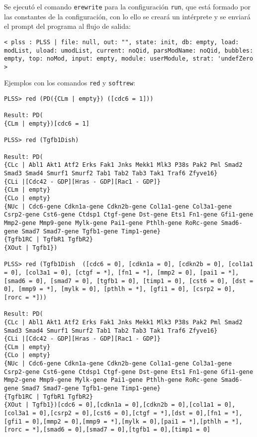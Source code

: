 Se ejecutó el comando \texttt{erewrite} para la configuración \texttt{run}, que está formado por las constantes de la configuración, con lo ello se creará un intérprete y se enviará el prompt del programa al flujo de salida:
\begin{lstlisting}[language=Maude]
< plss : PLSS | file: null, out: "", state: init, db: empty, load: modList, uload: umodList, current: noQid, parsModName: noQid, bubbles: empty, top: noMod, input: empty, module: userModule, strat: 'undefZero >
\end{lstlisting}
\smallskip


Ejemplos con los comandos \texttt{red} y \texttt{softrew}:
\begin{lstlisting}[language=Maude]
PLSS> red (PD({CLm | empty}) ([cdc6 = 1]))

Result: PD(
{CLm | empty})[cdc6 = 1]

PLSS> red (Tgfb1Dish)

Result: PD(
{CLc | Abl1 Akt1 Atf2 Erks Fak1 Jnks Mekk1 Mlk3 P38s Pak2 Pml Smad2 Smad3 Smad4 Smurf1 Smurf2 Tab1 Tab2 Tab3 Tak1 Traf6 Zfyve16}
{CLi |[Cdc42 - GDP][Hras - GDP][Rac1 - GDP]}
{CLm | empty}
{CLo | empty}
{NUc | Cdc6-gene Cdkn1a-gene Cdkn2b-gene Col1a1-gene Col3a1-gene Csrp2-gene Cst6-gene Ctdsp1 Ctgf-gene Dst-gene Ets1 Fn1-gene Gfi1-gene Mmp2-gene Mmp9-gene Mylk-gene Pai1-gene Pthlh-gene RoRc-gene Smad6-gene Smad7 Smad7-gene Tgfb1-gene Timp1-gene}
{Tgfb1RC | TgfbR1 TgfbR2}
{XOut | Tgfb1})

PLSS> red (Tgfb1Dish  ([cdc6 = 0], [cdkn1a = 0], [cdkn2b = 0], [col1a1 = 0], [col3a1 = 0], [ctgf = *], [fn1 = *], [mmp2 = 0], [pai1 = *], [smad6 = 0], [smad7 = 0], [tgfb1 = 0], [timp1 = 0], [cst6 = 0], [dst = 0], [mmp9 = *], [mylk = 0], [pthlh = *], [gfi1 = 0], [csrp2 = 0], [rorc = *]))

Result: PD(
{CLc | Abl1 Akt1 Atf2 Erks Fak1 Jnks Mekk1 Mlk3 P38s Pak2 Pml Smad2 Smad3 Smad4 Smurf1 Smurf2 Tab1 Tab2 Tab3 Tak1 Traf6 Zfyve16}
{CLi |[Cdc42 - GDP][Hras - GDP][Rac1 - GDP]}
{CLm | empty}
{CLo | empty}
{NUc | Cdc6-gene Cdkn1a-gene Cdkn2b-gene Col1a1-gene Col3a1-gene Csrp2-gene Cst6-gene Ctdsp1 Ctgf-gene Dst-gene Ets1 Fn1-gene Gfi1-gene Mmp2-gene Mmp9-gene Mylk-gene Pai1-gene Pthlh-gene RoRc-gene Smad6-gene Smad7 Smad7-gene Tgfb1-gene Timp1-gene}
{Tgfb1RC | TgfbR1 TgfbR2}
{XOut | Tgfb1})[cdc6 = 0],[cdkn1a = 0],[cdkn2b = 0],[col1a1 = 0],[col3a1 = 0],[csrp2 = 0],[cst6 = 0],[ctgf = *],[dst = 0],[fn1 = *],[gfi1 = 0],[mmp2 = 0],[mmp9 = *],[mylk = 0],[pai1 = *],[pthlh = *],[rorc = *],[smad6 = 0],[smad7 = 0],[tgfb1 = 0],[timp1 = 0]
\end{lstlisting}
\smallskip


